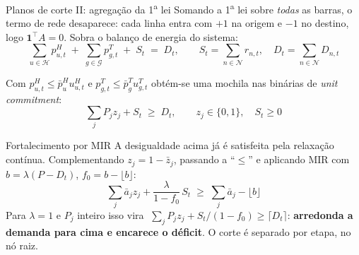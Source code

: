\documentclass[10pt,aspectratio=169]{beamer}
\newcommand{\Nb}{\mathcal{N}}          %
\newcommand{\Hb}{\mathcal{H}}          %
\newcommand{\Gb}{\mathcal{G}}          %
\newcommand{\pH}{p^{H}}                %
\newcommand{\pT}{p^{T}}                %
\newcommand{\uH}{u^{H}}                %
\newcommand{\uT}{u^{T}}                %
\begin{document}
\begin{frame}{Planos de corte II: agregação da 1\textsuperscript{a} lei}
  \small
  Somando a 1\textsuperscript{a} lei sobre \emph{todas} as barras, o termo de
  rede desaparece: cada linha entra com $+1$ na origem e $-1$ no destino, logo
  $\mathbf{1}^\top A = 0$. Sobra o balanço de energia do sistema:
  \[
    \sum_{u \in \Hb} \pH_{u,t} \;+\; \sum_{g \in \Gb} \pT_{g,t} \;+\; S_t \;=\; D_t,
    \qquad S_t = \sum_{n \in \Nb} r_{n,t}, \quad D_t = \sum_{n \in \Nb} D_{n,t}
  \]

  Com $\pH_{u,t} \le \bar p^H_u \uH_{u,t}$ e $\pT_{g,t} \le \bar p^T_g \uT_{g,t}$
  obtém-se uma \alert{mochila} nas binárias de \emph{unit commitment}:
  \[
    \sum_j P_j z_j + S_t \;\ge\; D_t,
    \qquad z_j \in \{0,1\}, \quad S_t \ge 0
  \]

  \begin{block}{Fortalecimento por MIR}
    \footnotesize
    A desigualdade acima já é satisfeita pela relaxação contínua. Complementando
    $z_j = 1 - \bar z_j$, passando a ``$\le$'' e aplicando MIR com
    $b = \lambda(P - D_t)$, $f_0 = b - \lfloor b \rfloor$:
    \[
      \sum_j \bar a_j z_j + \frac{\lambda}{1-f_0}\, S_t
      \;\ge\; \sum_j \bar a_j - \lfloor b \rfloor
    \]
    Para $\lambda = 1$ e $P_j$ inteiro isso vira
    $\;\sum_j P_j z_j + S_t/(1-f_0) \ge \lceil D_t \rceil$: \textbf{arredonda a
    demanda para cima e encarece o déficit}. O corte é separado por etapa, no nó raiz.
  \end{block}
\end{frame}
\end{document}
